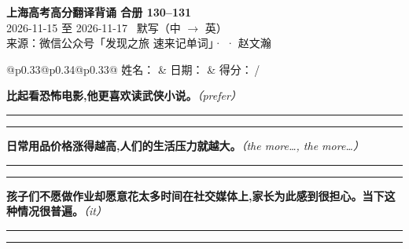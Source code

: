\documentclass[11pt,a4paper]{article}
\newcommand{\num}[1]{\makebox[1.9em][r]{#1.}\hspace{0.3em}}
\newcommand{\wline}{\noindent\rule{\linewidth}{0.4pt}}
\newcommand{\prompt}[1]{\emph{\textcolor{tipblue}{\small（#1）}}}
\begin{document}
\pagestyle{plain}
\begin{center}
{\LARGE\bfseries 上海高考高分翻译背诵 \quad 合册 130–131}\\[0.25em]
{\large 2026-11-15 至 2026-11-17 \quad\ 默写（中 $\to$ 英）}\\[0.35em]
{\footnotesize 来源：微信公众号「发现之旅 速来记单词」·  · 赵文瀚}
\end{center}

\vspace{0.4em}
\noindent\begin{tabular}{@{}p{0.33\textwidth}@{}p{0.34\textwidth}@{}p{0.33\textwidth}@{}}
姓名：\underline{\hspace{2.0cm}} & 日期：\underline{\hspace{2.0cm}} & 得分：\underline{\hspace{1.4cm}}\,/ \\
\end{tabular}

\vspace{0.5em}

\vspace{0.8em}
\vspace{0.35em}\vspace{0.15em}

\begin{minipage}{\linewidth}

\num{1}\textbf{比起看恐怖电影,他更喜欢读武侠小说。}\prompt{prefer}

\vspace{0.3em}

\wline\vspace{0.3em}
\wline

\end{minipage}

\begin{minipage}{\linewidth}

\num{2}\textbf{日常用品价格涨得越高,人们的生活压力就越大。}\prompt{the more…, the more…}

\vspace{0.3em}

\wline\vspace{0.3em}
\wline

\end{minipage}

\begin{minipage}{\linewidth}

\num{3}\textbf{孩子们不愿做作业却愿意花太多时间在社交媒体上,家长为此感到很担心。当下这种情况很普遍。}\prompt{it}

\vspace{0.3em}

\wline\vspace{0.3em}
\wline

\end{minipage}
\end{document}
